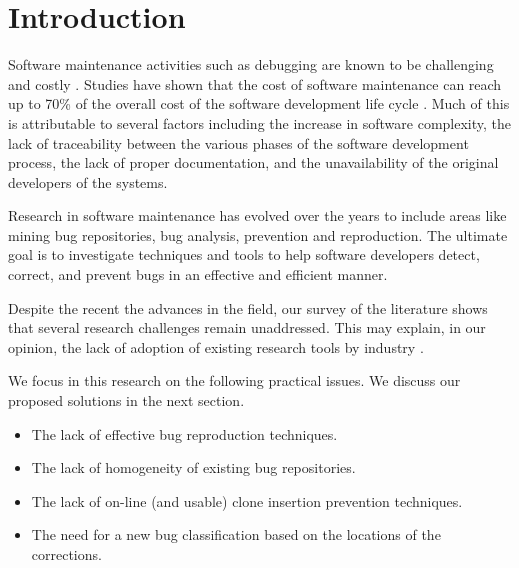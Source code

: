 
\setcounter{page}{1}

\chapter{Introduction}

Software maintenance activities such as debugging are known to be challenging and costly \cite{Pressman2005}.
Studies have shown that the cost of software maintenance can reach up to 70\% of the overall cost of the software development life cycle \cite{HealthSocial2002}.
Much of this is attributable to several factors including the increase in software complexity, the lack of traceability between the various phases of the software development process, the lack of proper documentation,  and the unavailability of the original developers of the systems.

Research in software maintenance has evolved over the years to include areas like mining bug repositories, bug analysis, prevention and reproduction.
The ultimate goal is to investigate techniques and tools to help software developers detect, correct, and prevent bugs in an effective and efficient manner.

Despite the recent the advances in the field, our survey of the literature shows that several research challenges remain unaddressed.
This may explain, in our opinion, the lack of adoption of existing research tools by industry \cite{Lewis2013,Foss2015,Layman2007,Ayewah2007,Ayewah2008,Johnson2013,Norman2013, Hovemeyer2004, Lopez2011}.

We focus in this research on the following practical issues.
We discuss our proposed solutions in the next section.
\begin{itemize}
	\item The lack of effective bug reproduction techniques.
	\item The lack of homogeneity of existing bug repositories.
	\item The lack of on-line (and usable) clone insertion prevention techniques.
	\item The need for a new bug classification based on the locations of the corrections.
\end{itemize}

